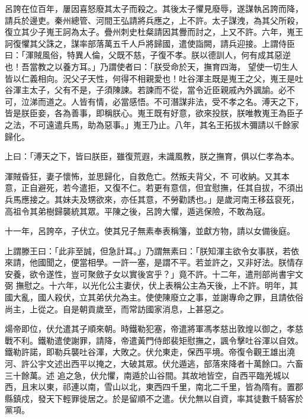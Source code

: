 \begin{pinyinscope}
 呂誇在位百年，屢因喜怒廢其太子而殺之。其後太子懼見廢辱，遂謀執呂誇而降，請兵於邊吏。秦州總管、河間王弘請將兵應之，上不許。太子謀洩，為其父所殺，復立其少子嵬王訶為太子。疊州刺史杜粲請因其釁而討之，上又不許。六年，嵬王訶復懼其父誅之，謀率部落萬五千人戶將歸國，遣使詣闕，請兵迎接。上謂侍臣曰：「渾賊風俗，特異人倫，父既不慈，子復不孝。朕以德訓人，何有成其惡逆也！吾當教之以養方耳。」乃謂使者曰：「朕受命於天，撫育四海，
 望使一切生人皆以仁義相向。況父子天性，何得不相親愛也！吐谷渾主既是嵬王之父，嵬王是吐谷渾主太子，父有不是，子須陳諫。若諫而不從，當令近臣親戚內外諷諭。必不可，泣涕而道之。人皆有情，必當感悟。不可潛謀非法，受不孝之名。溥天之下，皆是朕臣妾，各為善事，即稱朕心。嵬王既有好意，欲來投朕，朕唯教嵬王為臣子之法，不可遠遣兵馬，助為惡事。」嵬王乃止。八年，其名王拓拔木彌請以千餘家歸化。



 上曰：「溥天之下，皆曰朕臣，雖復荒遐，未識風教，朕之撫育，俱以仁孝為本。



 渾賊昏狂，妻子懷怖，並思歸化，自救危亡。然叛夫背父，不
 可收納。又其本意，正自避死，若今遣拒，又復不仁。若更有意信，但宜慰撫，任其自拔，不須出兵馬應接之。其妹夫及甥欲來，亦任其意，不勞勸誘也。」是歲河南王移茲裒死，高祖令其弟樹歸襲統其眾。平陳之後，呂誇大懼，遁逃保險，不敢為寇。



 十一年，呂誇卒，子伏立。使其兄子無素奉表稱籓，並獻方物，請以女備後庭。



 上謂滕王曰：「此非至誠，但急計耳。」乃謂無素曰：「朕知渾主欲令女事朕，若依來請，他國聞之，便當相學。一許一塞，是謂不平。若並許之，又非好法。朕情存安養，欲令遂性，豈可聚斂子女以實後宮乎？」竟不許。十二年，遣刑部尚書宇文弼
 撫慰之。十六年，以光化公主妻伏，伏上表稱公主為天後，上不許。明年，其國大亂，國人殺伏，立其弟伏允為主。使使陳廢立之事，並謝專命之罪，且請依俗尚主，上從之。自是朝貢歲至，而常訪國家消息，上甚惡之。



 煬帝即位，伏允遣其子順來朝。時鐵勒犯塞，帝遣將軍馮孝慈出敦煌以御之，孝慈戰不利。鐵勒遣使謝罪，請降，帝遣黃門侍郎裴矩慰撫之，諷令擊吐谷渾以自效。鐵勒許諾，即勒兵襲吐谷渾，大敗之。伏允東走，保西平境。帝復令觀王雄出澆河、許公宇文述出西平以掩之，大破其眾。伏允遁逃，部落來降者十萬餘口。六畜三十餘萬。述
 追之急，伏允懼，南遁於山谷間。其故地皆空，自西平臨羌城以西，且末以東，祁連以南，雪山以北，東西四千里，南北二千里，皆為隋有。置郡縣鎮戍，發天下輕罪徙居之。於是留順不之遣。伏允無以自資，率其徒數千騎客於黨項。




\end{pinyinscope}
